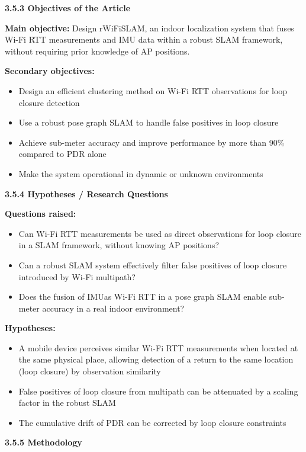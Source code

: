 \documentclass{ipgpmaster}
\begin{document}
 \textbf{3.5.3 Objectives of the Article}

\textbf{Main objective:} Design rWiFiSLAM, an indoor localization system that fuses Wi-Fi RTT measurements and IMU data within a robust SLAM framework, without requiring prior knowledge of AP positions.

\textbf{Secondary objectives:}

\begin{itemize}
    \item Design an efficient clustering method on Wi-Fi RTT observations for loop closure detection
    \item Use a robust pose graph SLAM to handle false positives in loop closure
    \item Achieve sub-meter accuracy and improve performance by more than 90\% compared to PDR alone
    \item Make the system operational in dynamic or unknown environments

\end{itemize}
 \textbf{3.5.4 Hypotheses / Research Questions}

\textbf{Questions raised:}

\begin{itemize}
    \item Can Wi-Fi RTT measurements be used as direct observations for loop closure in a SLAM framework, without knowing AP positions?
    \item Can a robust SLAM system effectively filter false positives of loop closure introduced by Wi-Fi multipath?
    \item Does the fusion of IMUas  Wi-Fi RTT in a pose graph SLAM enable sub-meter accuracy in a real indoor environment?

\end{itemize}
\textbf{Hypotheses:}

\begin{itemize}
    \item A mobile device perceives similar Wi-Fi RTT measurements when located at the same physical place, allowing detection of a return to the same location (loop closure) by observation similarity
    \item False positives of loop closure from multipath can be attenuated by a scaling factor in the robust SLAM
    \item The cumulative drift of PDR can be corrected by loop closure constraints


\end{itemize}
 \textbf{3.5.5   Methodology}
\end{document}
